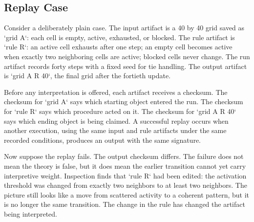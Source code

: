 \documentclass[11pt,a4paper,openany]{book}
\begin{document}
\subsection{Replay Case}
Consider a deliberately plain case. The input artifact is a 40 by 40 grid saved as `grid A`: each cell is empty, active, exhausted, or blocked. The rule artifact is `rule R`: an active cell exhausts after one step; an empty cell becomes active when exactly two neighboring cells are active; blocked cells never change. The run artifact records forty steps with a fixed seed for tie handling. The output artifact is `grid A R 40`, the final grid after the fortieth update. \cite{nicolis_prigogine_selforg,kauffman_autocatalytic}\par
Before any interpretation is offered, each artifact receives a checksum. The checksum for `grid A` says which starting object entered the run. The checksum for `rule R` says which procedure acted on it. The checksum for `grid A R 40` says which ending object is being claimed. A successful replay occurs when another execution, using the same input and rule artifacts under the same recorded conditions, produces an output with the same signature.\par
Now suppose the replay fails. The output checksum differs. The failure does not mean the theory is false, but it does mean the earlier transition cannot yet carry interpretive weight. Inspection finds that `rule R` had been edited: the activation threshold was changed from exactly two neighbors to at least two neighbors. The picture still looks like a move from scattered activity to a coherent pattern, but it is no longer the same transition. The change in the rule has changed the artifact being interpreted.\par
\end{document}
